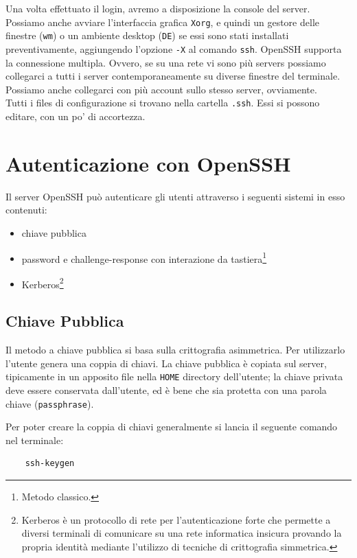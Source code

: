 Una volta effettuato il login, avremo a disposizione la console del server. Possiamo anche avviare l'interfaccia grafica \verb*|Xorg|, e quindi un gestore delle finestre (\verb*|wm|) o un ambiente desktop (\verb*|DE|) se essi sono stati installati preventivamente, aggiungendo l'opzione \verb*|-X| al comando \verb*|ssh|. OpenSSH supporta la connessione multipla. Ovvero, se su una rete vi sono più servers possiamo collegarci a tutti i server contemporaneamente su diverse finestre del terminale. Possiamo anche collegarci con più account sullo stesso server, ovviamente. \\
Tutti i files di configurazione si trovano nella cartella \verb*|.ssh|. Essi si possono editare, con un po' di accortezza. 

\section{Autenticazione con OpenSSH}
Il server OpenSSH può autenticare gli utenti attraverso i seguenti sistemi in esso contenuti:
\begin{itemize}
	\item chiave pubblica
	\item password e challenge-response con interazione da tastiera\footnote{Metodo classico.}
	\item Kerberos\footnote{ Kerberos è un protocollo di rete per l'autenticazione forte che permette a diversi terminali di comunicare su una rete informatica insicura provando la propria identità mediante l'utilizzo di tecniche di crittografia simmetrica.}
\end{itemize}

\subsection{Chiave Pubblica}
Il metodo a chiave pubblica si basa sulla crittografia asimmetrica. Per utilizzarlo l'utente genera una coppia di chiavi. La chiave pubblica è copiata sul server, tipicamente in un apposito file nella \verb*|HOME| directory dell'utente; la chiave privata deve essere conservata dall'utente, ed è bene che sia protetta con una parola chiave (\verb*|passphrase|).

Per poter creare la coppia di chiavi generalmente si lancia il seguente comando nel terminale: 

\begin{verbatim}
	ssh-keygen
\end{verbatim}

